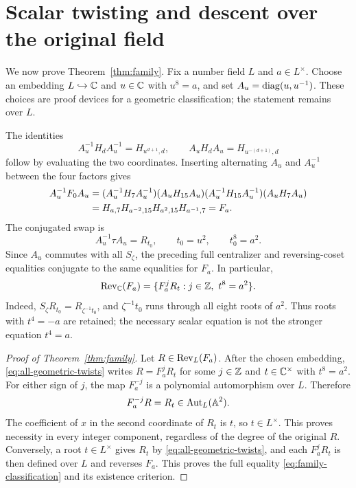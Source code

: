 \section{Scalar twisting and descent over the original field}
\label{sec:descent}

We now prove Theorem~\ref{thm:family}. Fix a number field $L$ and
$a\in L^\times$. Choose an embedding $L\hookrightarrow\mathbb C$ and
$u\in\mathbb C$ with $u^8=a$, and set
$A_u=\operatorname{diag}(u,u^{-1})$. These choices are proof devices for a
geometric classification; the statement remains over $L$.

The identities
\begin{equation}\label{eq:alternating-twist}
  A_u^{-1}H_dA_u^{-1}=H_{u^{d+1},d},
  \qquad
  A_uH_dA_u=H_{u^{-(d+1)},d}
\end{equation}
follow by evaluating the two coordinates. Inserting alternating
$A_u$ and $A_u^{-1}$ between the four factors gives
\begin{align}
  A_u^{-1}F_0A_u
  &=(A_u^{-1}H_7A_u^{-1})(A_uH_{15}A_u)
    (A_u^{-1}H_{15}A_u^{-1})(A_uH_7A_u)\notag\\
  &=H_{a,7}H_{a^{-2},15}H_{a^2,15}H_{a^{-1},7}
   =F_a. \label{eq:family-conjugation}
\end{align}
The conjugated swap is
\begin{equation}\label{eq:twisted-swap}
  A_u^{-1}\tau A_u=R_{t_0},\qquad t_0=u^2,\qquad t_0^8=a^2.
\end{equation}
Since $A_u$ commutes with all $S_\zeta$, the preceding full
centralizer and reversing-coset equalities conjugate to the same
equalities for $F_a$. In particular,
\begin{equation}\label{eq:all-geometric-twists}
  \operatorname{Rev}_{\mathbb C}(F_a)
  =\{F_a^jR_t:j\in\mathbb Z,\ t^8=a^2\}.
\end{equation}
Indeed,
$S_\zeta R_{t_0}=R_{\zeta^{-1}t_0}$, and
$\zeta^{-1}t_0$ runs through all eight roots of $a^2$.
Thus roots with $t^4=-a$ are retained; the necessary scalar
equation is not the stronger equation $t^4=a$.

\begin{proof}[Proof of Theorem~\ref{thm:family}]
Let $R\in\operatorname{Rev}_L(F_a)$. After the chosen embedding,
\eqref{eq:all-geometric-twists} writes $R=F_a^jR_t$ for some
$j\in\mathbb Z$ and $t\in\mathbb C^\times$ with $t^8=a^2$.
For either sign of $j$, the map $F_a^{-j}$ is a polynomial
automorphism over $L$. Therefore
\[
  F_a^{-j}R=R_t\in\operatorname{Aut}_L(\mathbb A^2).
\]
The coefficient of $x$ in the second coordinate of $R_t$ is $t$,
so $t\in L^\times$. This proves necessity in every integer
component, regardless of the degree of the original $R$.
Conversely, a root $t\in L^\times$ gives $R_t$ by
\eqref{eq:all-geometric-twists}, and each $F_a^jR_t$ is then
defined over $L$ and reverses $F_a$.
This proves the full equality \eqref{eq:family-classification}
and its existence criterion.
\end{proof}

